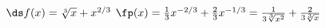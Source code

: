{$\ds f(x) = \sqrt[3]{x} + x^{2/3}$
}
{$\fp(x) = \frac13x^{-2/3}+\frac23x^{-1/3} = \frac1{3\sqrt[3]{x^2}}+\frac2{3\sqrt[3]{x}}$
}
